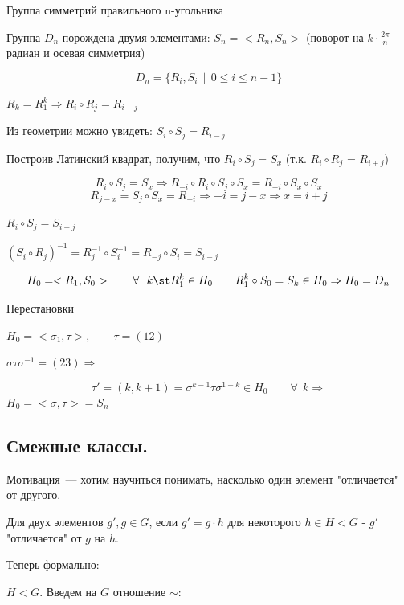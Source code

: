 \begin{Example}{Группа симметрий правильного n-угольника}{}

    Группа $D_n$ порождена двумя элементами: $S_n = <R_n, S_n>$ (поворот на $k\cdot \frac{2\pi}{n}$ радиан и осевая симметрия)

    \[   
    D_n = \{ R_i, S_i \ \ | \ \ 0 \le i \le n-1 \}
    \]

    $R_k = R^k_1 \Rightarrow R_i \circ R_j = R_{i+j}$

    Из геометрии можно увидеть: $S_i \circ S_j = R_{i-j}$

    Построив Латинский квадрат, получим, что $R_i \circ S_j = S_x$ (т.к. $R_i \circ R_j$ = $R_{i+j}$)
    
    \[  
    R_i \circ S_j = S_x \Rightarrow R_{-i} \circ R_i \circ S_j \circ S_x = R_{-i} \circ S_x \circ S_x
    \]
    \[
    R_{j-x} = S_j \circ S_x = R_{-i} \Rightarrow -i = j - x \Rightarrow x = i +j
    \]

    $R_i \circ S_j = S_{i+j}$

    $(S_i \circ R_j)^{-1} = R^{-1}_j \circ S^{-1}_i = R_{-j} \circ S_i = S_{i-j}$
    
    \[ H_0 = <R_1, S_0> \qquad \forall \ \ k \st R^k_1 \in H_0 \qquad R^k_1\circ S_0 = S_k \in H_0 \Rightarrow H_0 = D_n \]
\end{Example}

\begin{Example}{Перестановки}{}

    $H_0 = <\sigma_1, \tau>, \qquad \tau = (12)$

    $\sigma \tau \sigma^{-1} = (23)\Rightarrow$

    \[ \tau' = (k, k+1) = \sigma^{k-1}\tau \sigma^{1-k} \in H_0 \qquad \forall \ \ k \Rightarrow \]
    $H_0 = <\sigma, \tau> = S_n$
\end{Example}

\subsection{Смежные классы.}

Мотивация~--- хотим научиться понимать, насколько один элемент "отличается" от другого.

Для двух элементов $g', g \in G$, если $g' = g \cdot h$ для некоторого $h \in H < G$ - $g'$ "отличается" от $g$ на $h$.

Теперь формально:

$H < G$. Введем на $G$ отношение $\sim$:

